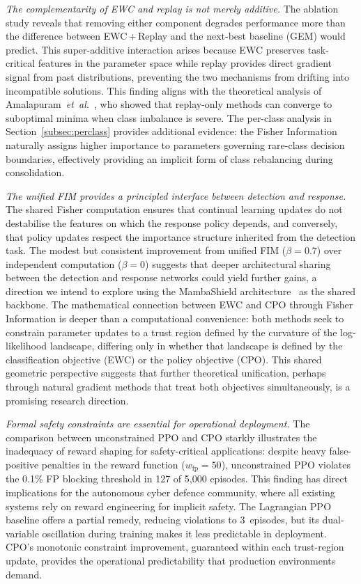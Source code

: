 \documentclass[journal]{IEEEtran}
\theoremstyle{definition}
\theoremstyle{remark}
\begin{document}
\textit{The complementarity of EWC and replay is not merely additive.} The ablation study reveals that removing either component degrades performance more than the difference between EWC\,+\,Replay and the next-best baseline (GEM) would predict. This super-additive interaction arises because EWC preserves task-critical features in the parameter space while replay provides direct gradient signal from past distributions, preventing the two mechanisms from drifting into incompatible solutions. This finding aligns with the theoretical analysis of Amalapuram~\textit{et~al.}~\cite{amalapuram2023augmented}, who showed that replay-only methods can converge to suboptimal minima when class imbalance is severe. The per-class analysis in Section~\ref{subsec:perclass} provides additional evidence: the Fisher Information naturally assigns higher importance to parameters governing rare-class decision boundaries, effectively providing an implicit form of class rebalancing during consolidation.

\textit{The unified FIM provides a principled interface between detection and response.} The shared Fisher computation ensures that continual learning updates do not destabilise the features on which the response policy depends, and conversely, that policy updates respect the importance structure inherited from the detection task. The modest but consistent improvement from unified FIM ($\beta = 0.7$) over independent computation ($\beta = 0$) suggests that deeper architectural sharing between the detection and response networks could yield further gains, a direction we intend to explore using the MambaShield architecture~\cite{anaedevha2026mambashield} as the shared backbone. The mathematical connection between EWC and CPO through Fisher Information is deeper than a computational convenience: both methods seek to constrain parameter updates to a trust region defined by the curvature of the log-likelihood landscape, differing only in whether that landscape is defined by the classification objective (EWC) or the policy objective (CPO). This shared geometric perspective suggests that further theoretical unification, perhaps through natural gradient methods that treat both objectives simultaneously, is a promising research direction.

\textit{Formal safety constraints are essential for operational deployment.} The comparison between unconstrained PPO and CPO starkly illustrates the inadequacy of reward shaping for safety-critical applications: despite heavy false-positive penalties in the reward function ($w_{\mathrm{fp}} = 50$), unconstrained PPO violates the 0.1\% FP blocking threshold in 127 of 5{,}000 episodes. This finding has direct implications for the autonomous cyber defence community, where all existing systems rely on reward engineering for implicit safety. The Lagrangian PPO baseline offers a partial remedy, reducing violations to 3~episodes, but its dual-variable oscillation during training makes it less predictable in deployment. CPO's monotonic constraint improvement, guaranteed within each trust-region update, provides the operational predictability that production environments demand.
\end{document}
